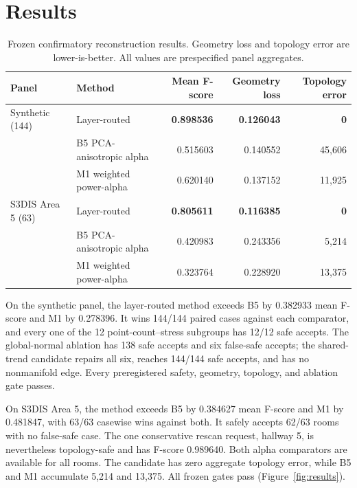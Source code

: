 \documentclass[12pt,a4paper]{article}
\begin{document}
\section{Results}

\begin{table}[t]
\centering
\caption{Frozen confirmatory reconstruction results. Geometry loss and topology
error are lower-is-better. All values are prespecified panel aggregates.}
\label{tab:results}
\footnotesize
\setlength{\tabcolsep}{3pt}
\begin{tabular}{p{}p{}rrr}
\toprule
Panel & Method & Mean F-score & Geometry loss & Topology error \\
\midrule
Synthetic (144) & Layer-routed & \textbf{0.898536} & \textbf{0.126043} & \textbf{0} \\
 & B5 PCA-anisotropic alpha & 0.515603 & 0.140552 & 45,606 \\
 & M1 weighted power-alpha & 0.620140 & 0.137152 & 11,925 \\
\addlinespace
S3DIS Area 5 (63) & Layer-routed & \textbf{0.805611} & \textbf{0.116385} & \textbf{0} \\
 & B5 PCA-anisotropic alpha & 0.420983 & 0.243356 & 5,214 \\
 & M1 weighted power-alpha & 0.323764 & 0.228920 & 13,375 \\
\bottomrule
\end{tabular}
\end{table}

On the synthetic panel, the layer-routed method exceeds B5 by 0.382933 mean
F-score and M1 by 0.278396. It wins 144/144 paired cases against each comparator,
and every one of the 12 point-count--stress subgroups has 12/12 safe accepts.
The global-normal ablation has 138 safe accepts and six false-safe accepts; the
shared-trend candidate repairs all six, reaches 144/144 safe accepts, and has no
nonmanifold edge. Every preregistered safety, geometry, topology, and ablation gate
passes.

On S3DIS Area 5, the method exceeds B5 by 0.384627 mean F-score and M1 by
0.481847, with 63/63 casewise wins against both. It safely accepts 62/63 rooms
with no false-safe case. The one conservative rescan request, hallway 5, is
nevertheless topology-safe and has F-score 0.989640. Both alpha comparators are
available for all rooms. The candidate has zero aggregate topology error, while
B5 and M1 accumulate 5,214 and 13,375. All frozen gates pass
(Figure~\ref{fig:results}).
\end{document}
